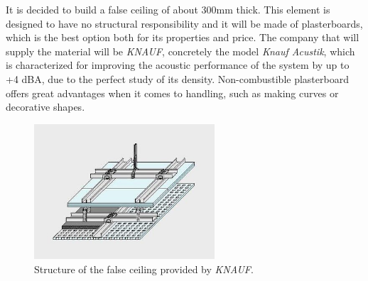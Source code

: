 It is decided to build a false ceiling of about 300mm thick. This element is designed to have no structural responsibility and it will be made of plasterboards, which is the best option both for its properties and price. The company that will supply the material will be \textit{KNAUF}, concretely the model \textit{Knauf Acustik}, which is characterized for improving the acoustic performance of the system by up to +4 dBA, due to the perfect study of its density. Non-combustible plasterboard offers great advantages when it comes to handling, such as making curves or decorative shapes.

\begin{figure}[H]
	\centering
	\includegraphics[clip, trim=0cm 0cm 0cm 0cm, width=0.6\textwidth]{./images/cover/falseceiling}
	\caption{Structure of the false ceiling provided by \textit{KNAUF}.}
	\label{falseceiling}
\end{figure}